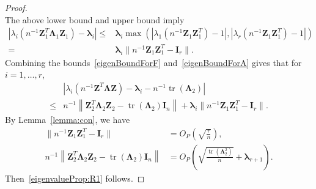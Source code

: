 \documentclass[12pt]{article} %
\DeclareMathOperator{\mytr}{tr}
\newcommand{\bZ}{\mathbf{Z}}
\newcommand{\bI}{\mathbf{I}}
\newcommand{\bfsym}[1]{\ensuremath{\boldsymbol{#1}}}
\def\blambda {\bfsym {\lambda}}
\def\bLambda {\bfsym {\Lambda}}
\theoremstyle{definition}
\begin{document}
\begin{appendices}
\begin{proof}
\begin{equation*}
\end{equation*}
The above lower bound and upper bound imply
\begin{equation}\label{eigenBoundForA}
    \begin{aligned}
\left|
\lambda_i(n^{-1}\bZ_1^T \bLambda_1 \bZ_1)-\blambda_i
\right|
\leq&
\blambda_i 
\max\left(
    |\lambda_1(n^{-1}\bZ_1 \bZ_1^T)-1|,
    |\lambda_r(n^{-1}\bZ_1 \bZ_1^T)-1|
\right)
\\
=&\blambda_i \|n^{-1}\bZ_1\bZ_1^T -\bI_r\|.
    \end{aligned}
\end{equation}
Combining the bounds~\eqref{eigenBoundForF} and~\eqref{eigenBoundForA} gives that for $i=1,\ldots,r$,
\begin{equation*}
    \begin{split}
        &
        \left|
        \lambda_i\left(n^{-1}\bZ^T \bLambda \bZ\right)
        -
        \blambda_i
        -
        n^{-1}\mytr(\bLambda_2)
        \right|
        \\
        \leq&
        n^{-1}\left\|\bZ_2^T \bLambda_2 \bZ_2-\mytr(\bLambda_2) \bI_n\right\|
        +\blambda_i \|n^{-1}\bZ_1\bZ_1^T -\bI_r\|.
    \end{split}
\end{equation*}
    By Lemma~\ref{lemma:con}, we have
\begin{align}
    \label{conB2B1}
            \|n^{-1}\bZ_1\bZ_1^T -\bI_r\|&=
            O_P\left(\sqrt{\frac{r}{n}}\right),
        \\
        \label{conB2B}
        n^{-1}\left\|\bZ_2^T \bLambda_2 \bZ_2-\mytr(\bLambda_2)\bI_n\right\|&=O_P\left(\sqrt{\frac{\mytr(\bLambda_2^2)}{ n}}+\blambda_{r+1}\right).
\end{align}
Then~\eqref{eigenvalueProp:R1} follows.


\end{proof}
\end{appendices}
\end{document}
